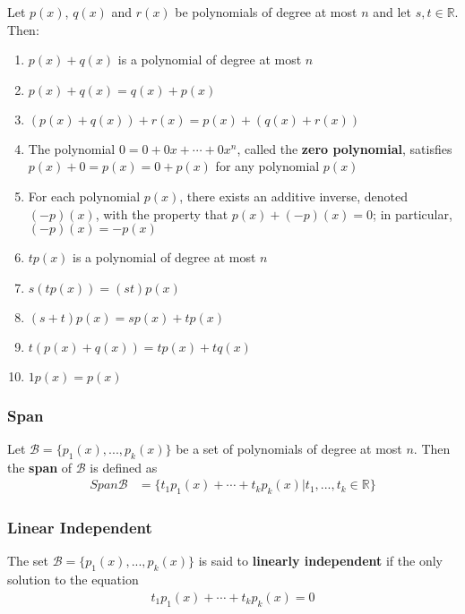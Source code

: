 \documentclass[a4paper,9pt]{extarticle}
\begin{document}
\begin{multicols*}{2}
Let $p(x)$, $q(x)$ and $r(x)$ be polynomials of degree at most $n$ and let $s, t \in \mathbb{R}$. Then:
\begin{enumerate}[label=\bfseries (\arabic*)] \itemsep0pt \parskip0pt 
    \item $p(x) + q(x)$ is a polynomial of degree at most $n$
    \item $p(x) + q(x) = q(x) + p(x)$
    \item $(p(x) + q(x)) + r(x) = p(x) + (q(x) + r(x))$
    \item The polynomial $0 = 0 + 0x + \cdots + 0x^n$, called the \textbf{zero polynomial}, satisfies $p(x) + 0 = p(x) = 0 + p(x)$ for any polynomial $p(x)$
    \item For each polynomial $p(x)$, there exists an additive inverse, denoted $(-p)(x)$, with the property that $p(x) + (-p)(x) = 0$; in particular, $(-p)(x) = -p(x)$
    \item $t p(x)$ is a polynomial of degree at most $n$
    \item $s(tp(x)) = (st)p(x)$
    \item $(s + t)p(x) = s p(x) + t p(x)$
    \item $t(p(x) + q(x)) = t p(x) + t q(x)$
    \item $1 p(x) = p(x)$
\end{enumerate}


\subsubsection{Span}
Let $\mathcal{B} = \{p_1(x), ..., p_k(x)\}$ be a set of polynomials of degree at most $n$. Then the \textbf{span} of $\mathcal{B}$ is defined as 
\begin{equation} \label{4.1-1}
    \begin{split}
        Span \mathcal{B} & = \{t_1 p_1(x) + \cdots + t_k p_k(x) | t_1, ..., t_k \in \mathbb{R}\}
    \end{split}
\end{equation}


\subsubsection{Linear Independent}
The set $\mathcal{B} = \{p_1(x), ..., p_k(x)\}$ is said to \textbf{linearly independent} if the only solution to the equation 
\begin{equation} \label{4.1-2}
    \begin{split}
        t_1 p_1(x) + \cdots + t_k p_k(x) = 0
    \end{split}
\end{equation}


\end{multicols*}
\end{document}
